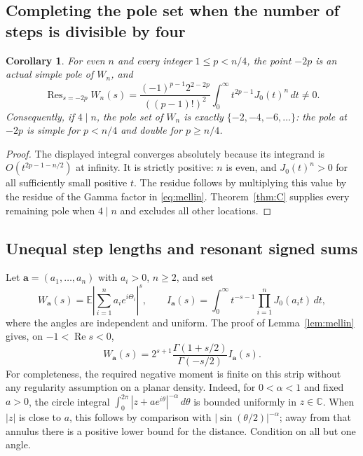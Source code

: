 \documentclass[11pt]{amsart}
\newtheorem{corollary}[thm]{Corollary}
\theoremstyle{definition}
\newcommand{\C}{\mathbb C}
\newcommand{\Res}{\operatorname{Res}}
\begin{document}
\subsection{Completing the pole set when the number of steps is divisible by four}

\begin{corollary}\label{cor:C-complete-four}
For even $n$ and every integer $1\le p<n/4$, the point $-2p$ is an actual simple pole of $W_n$, and
\[
 \Res_{s=-2p}W_n(s)
 =\frac{(-1)^{p-1}2^{2-2p}}{((p-1)!)^2}
   \int_0^\infty t^{2p-1}J_0(t)^n\,dt\ne0.
\]
Consequently, if $4\mid n$, the pole set of $W_n$ is exactly
$\{-2,-4,-6,\ldots\}$: the pole at $-2p$ is simple for $p<n/4$
and double for $p\ge n/4$.
\end{corollary}
\begin{proof}
The displayed integral converges absolutely because its integrand is
$O(t^{2p-1-n/2})$ at infinity. It is strictly positive: $n$ is even,
and $J_0(t)^n>0$ for all sufficiently small positive $t$.
The residue follows by multiplying this value by the residue of the Gamma
factor in \eqref{eq:mellin}. Theorem~\ref{thm:C} supplies every remaining
pole when $4\mid n$ and excludes all other locations.
\end{proof}

\subsection{Unequal step lengths and resonant signed sums}\label{subsec:weighted-walks}

Let $\boldsymbol a=(a_1,\ldots,a_n)$ with $a_i>0$, $n\ge2$, and set
\[
 W_{\boldsymbol a}(s)=\mathbb E\left|\sum_{i=1}^n a_i e^{i\Theta_i}\right|^s,
 \qquad
 I_{\boldsymbol a}(s)=\int_0^\infty t^{-s-1}\prod_{i=1}^nJ_0(a_it)\,dt,
\]
where the angles are independent and uniform. The proof of
Lemma~\ref{lem:mellin} gives, on $-1<\operatorname{Re}s<0$,
\begin{equation}\label{eq:weighted-mellin}
 W_{\boldsymbol a}(s)=2^{s+1}
 \frac{\Gamma(1+s/2)}{\Gamma(-s/2)}I_{\boldsymbol a}(s).
\end{equation}
For completeness, the required negative moment is finite on this strip
without any regularity assumption on a planar density. Indeed, for
$0<\alpha<1$ and fixed $a>0$, the circle integral
$\int_0^{2\pi}|z+ae^{i\theta}|^{-\alpha}\,d\theta$ is bounded uniformly in
$z\in\C$. When $|z|$ is close to $a$, this follows by comparison with
$|\sin(\theta/2)|^{-\alpha}$; away from that annulus there is a positive
lower bound for the distance. Condition on all but one angle.
\end{document}

